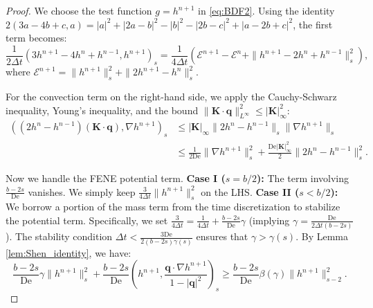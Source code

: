 \documentclass[10pt,a4paper]{amsart}
\begin{document}
\begin{proof}
We choose the test function $g = h^{n+1}$ in \eqref{eq:BDF2}. 
Using the identity $2(3a-4b+c, a) = |a|^2 + |2a-b|^2 - |b|^2 - |2b-c|^2 + |a-2b+c|^2$, the first term becomes:
\begin{equation}
    \frac{1}{2\Delta t}\left(3h^{n+1}-4h^{n}+h^{n-1}, h^{n+1}\right)_s = \frac{1}{4\Delta t}\left( \mathcal{E}^{n+1} - \mathcal{E}^n + \|h^{n+1}-2h^n+h^{n-1}\|_s^2 \right),
\end{equation}
where $\mathcal{E}^{n+1} = \|h^{n+1}\|_s^2 + \|2h^{n+1}-h^n\|_s^2$.

For the convection term on the right-hand side, we apply the Cauchy-Schwarz inequality, Young's inequality, and the bound $\|\boldsymbol{K}\cdot\boldsymbol{q}\|_{L^\infty}^2 \le |\boldsymbol{K}|_\infty^2$:
\begin{equation}
\begin{aligned}
    \left( (2h^n - h^{n-1}) (\bm{K}\cdot \bm{q}), \nabla h^{n+1} \right)_s 
    &\le |\boldsymbol{K}|_\infty \|2h^n - h^{n-1}\|_s \|\nabla h^{n+1}\|_s \\
    &\le \frac{1}{2\text{De}} \|\nabla h^{n+1}\|_s^2 + \frac{\text{De}|\boldsymbol{K}|_\infty^2}{2} \|2h^n - h^{n-1}\|_s^2.
\end{aligned}
\end{equation}

Now we handle the FENE potential term.
\textbf{Case I ($s=b/2$):} The term involving $\frac{b-2s}{\text{De}}$ vanishes. We simply keep $\frac{3}{4\Delta t}\|h^{n+1}\|_s^2$ on the LHS.
\textbf{Case II ($s<b/2$):} We borrow a portion of the mass term from the time discretization to stabilize the potential term. Specifically, we set $\frac{3}{4\Delta t} = \frac{1}{4\Delta t} + \frac{b-2s}{\text{De}}\gamma$ (implying $\gamma = \frac{\text{De}}{2\Delta t(b-2s)}$). The stability condition $\Delta t < \frac{3\text{De}}{2(b-2s)\gamma(s)}$ ensures that $\gamma > \gamma(s)$. By Lemma \ref{lem:Shen_identity}, we have:
\begin{equation}
    \frac{b-2s}{\text{De}}\gamma \|h^{n+1}\|_s^2 + \frac{b-2s}{\text{De}}\left(h^{n+1}, \frac{\bm{q}\cdot \nabla h^{n+1}}{1-|\bm{q}|^2}\right)_s \ge  \frac{b-2s}{\text{De}}\beta(\gamma)\|h^{n+1}\|_{s-2}^2.
\end{equation}


\end{proof}
\end{document}
